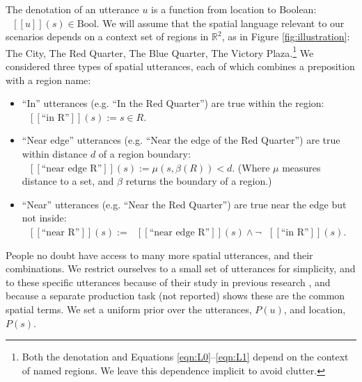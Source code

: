 \documentclass[10pt,letterpaper]{article}
\newcommand{\denote}[1]{\mbox{ $[\![ #1 ]\!]$}}
\begin{document}
The denotation of an utterance $u$ is a function from location to Boolean: $\denote{u}(s)\in \text{Bool}$.
We will assume that the spatial language relevant to our scenarios depends on a context set of regions in $\mathbb{R}^2$, as in Figure \ref{fig:illustration}: The City, The Red Quarter, The Blue Quarter, The Victory Plaza.\footnote{Both the denotation and Equations \ref{eqn:L0}--\ref{eqn:L1} depend on the context of named regions. We leave this dependence implicit to avoid clutter.}
We considered three types of spatial utterances, each of which combines a preposition with a region name: 
\begin{itemize}
\item ``In'' utterances (e.g. ``In the Red Quarter'') are true within the region: $\denote{\text{``in R''}}(s) := s\in R$.
\item ``Near edge'' utterances (e.g. ``Near the edge of the Red Quarter'') are true within distance $d$ of a region boundary: $\denote{\text{``near edge R''}}(s) := \mu(s,\beta(R))<d$. (Where $\mu$ measures distance to a set, and $\beta$ returns the boundary of a region.)
\item ``Near'' utterances (e.g. ``Near the Red Quarter'') are true near the edge but not inside: $\denote{\text{``near R''}}(s) := 
\denote{\text{``near edge R''}}(s) \wedge \neg \denote{\text{``in R''}}(s)$.
\end{itemize}
People no doubt have access to many more spatial utterances, and their combinations. We restrict ourselves to a small set of utterances for simplicity, and to these specific utterances because of their study in previous research \cite{herskovits85}, and because a separate production task (not reported) shows these are the common spatial terms. We set a uniform prior over the utterances, $P(u)$, and location, $P(s)$. 





\end{document}
